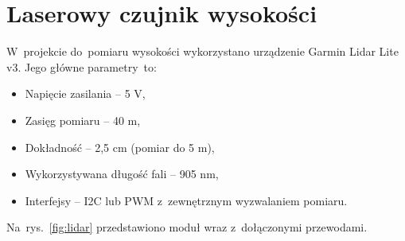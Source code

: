 \section{Laserowy czujnik wysokości}
\label{sec:laser}
W~projekcie do~pomiaru wysokości wykorzystano urządzenie Garmin Lidar Lite v3. 
Jego główne parametry~to:
\begin{itemize}
	\item Napięcie zasilania -- 5 V,
	\item Zasięg pomiaru -- 40 m,
	\item Dokładność -- 2,5 cm (pomiar do 5 m), 
	\item Wykorzystywana długość fali -- 905 nm,
	\item Interfejsy -- I2C lub PWM z~zewnętrznym wyzwalaniem pomiaru.
\end{itemize}
Na~rys.~\ref{fig:lidar} przedstawiono moduł wraz z~dołączonymi przewodami.



